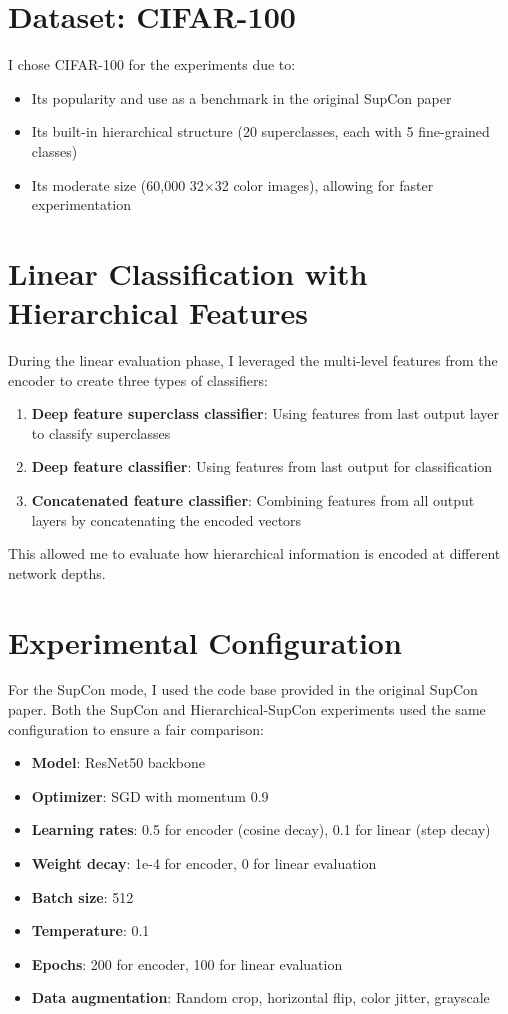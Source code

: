 \documentclass[10pt,a4paper]{article}
\begin{document}
\section{Dataset: CIFAR-100}

I chose CIFAR-100 for the experiments due to:
\begin{itemize}
    \item Its popularity and use as a benchmark in the original SupCon paper
    \item Its built-in hierarchical structure (20 superclasses, each with 5 fine-grained classes)
    \item Its moderate size (60,000 32×32 color images), allowing for faster experimentation
\end{itemize}

\section{Linear Classification with Hierarchical Features}

During the linear evaluation phase, I leveraged the multi-level features from the encoder to create three types of classifiers:
\begin{enumerate}
    \item \textbf{Deep feature superclass classifier}: Using features from last output layer to classify superclasses
    \item \textbf{Deep feature classifier}: Using features from last output for classification
    \item \textbf{Concatenated feature classifier}: Combining features from all output layers by concatenating the encoded vectors
\end{enumerate}

This allowed me to evaluate how hierarchical information is encoded at different network depths.

\section{Experimental Configuration}
For the SupCon mode, I used the code base provided in the original SupCon paper. 
Both the SupCon and Hierarchical-SupCon experiments used the same configuration to ensure a fair comparison:

\begin{itemize}
    \item \textbf{Model}: ResNet50 backbone
    \item \textbf{Optimizer}: SGD with momentum 0.9
    \item \textbf{Learning rates}: 0.5 for encoder (cosine decay), 0.1 for linear (step decay)
    \item \textbf{Weight decay}: 1e-4 for encoder, 0 for linear evaluation
    \item \textbf{Batch size}: 512
    \item \textbf{Temperature}: 0.1
    \item \textbf{Epochs}: 200 for encoder, 100 for linear evaluation
    \item \textbf{Data augmentation}: Random crop, horizontal flip, color jitter, grayscale
\end{itemize}
\end{document}
